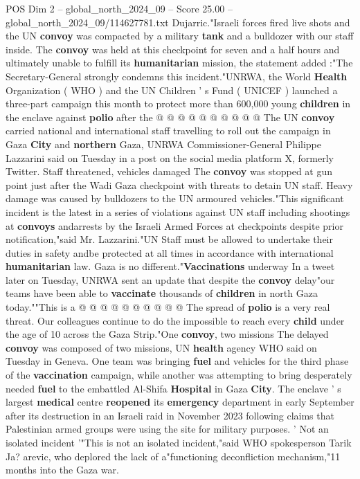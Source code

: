 \begin{textsample}{POS Dim 2 – global\_north\_2024\_09 – Score 25.00 – global\_north\_2024\_09/114627781.txt}
Dujarric."Israeli forces fired live shots and the UN \textbf{convoy} was compacted by a military \textbf{tank} and a bulldozer with our staff inside.
The \textbf{convoy} was held at this checkpoint for seven and a half hours and ultimately unable to fulfill its \textbf{humanitarian} mission, the statement added :"The Secretary-General strongly condemns this incident."UNRWA, the World \textbf{Health} Organization ( WHO ) and the UN Children ' s Fund ( UNICEF ) launched a three-part campaign this month to protect more than 600,000 young \textbf{children} in the enclave against \textbf{polio} after the @ @ @ @ @ @ @ @ @ @ The UN \textbf{convoy} carried national and international staff travelling to roll out the campaign in Gaza \textbf{City} and \textbf{northern} Gaza, UNRWA Commissioner-General Philippe Lazzarini said on Tuesday in a post on the social media platform X, formerly Twitter.
Staff threatened, vehicles damaged The \textbf{convoy} was stopped at gun point just after the Wadi Gaza checkpoint with threats to detain UN staff.
Heavy damage was caused by bulldozers to the UN armoured vehicles."This significant incident is the latest in a series of violations against UN staff including shootings at \textbf{convoys} andarrests by the Israeli Armed Forces at checkpoints despite prior notification,"said Mr.
Lazzarini."UN Staff must be allowed to undertake their duties in safety andbe protected at all times in accordance with international \textbf{humanitarian} law.
Gaza is no different."\textbf{Vaccinations} underway In a tweet later on Tuesday, UNRWA sent an update that despite the \textbf{convoy} delay"our teams have been able to \textbf{vaccinate} thousands of \textbf{children} in north Gaza today.""This is a @ @ @ @ @ @ @ @ @ @ The spread of \textbf{polio} is a very real threat.
Our colleagues continue to do the impossible to reach every \textbf{child} under the age of 10 across the Gaza Strip."One \textbf{convoy}, two missions The delayed \textbf{convoy} was composed of two missions, UN \textbf{health} agency WHO said on Tuesday in Geneva.
One team was bringing \textbf{fuel} and vehicles for the third phase of the \textbf{vaccination} campaign, while another was attempting to bring desperately needed \textbf{fuel} to the embattled Al-Shifa \textbf{Hospital} in Gaza \textbf{City}.
The enclave ' s largest \textbf{medical} centre \textbf{reopened} its \textbf{emergency} department in early September after its destruction in an Israeli raid in November 2023 following claims that Palestinian armed groups were using the site for military purposes. ' Not an isolated incident '"This is not an isolated incident,"said WHO spokesperson Tarik Ja? arevic, who deplored the lack of a"functioning deconfliction mechanism,"11 months into the Gaza war.

\end{textsample}
